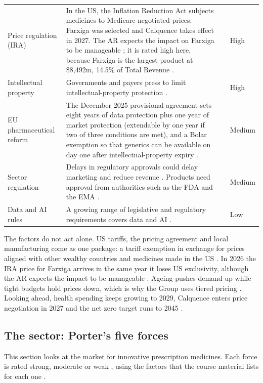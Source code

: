 \begin{xltabular}{\linewidth}{@{}N{2.6cm}Yp{2.1cm}p{1.5cm}@{}}
\midrule
Price regulation (IRA) & In the US, the Inflation Reduction Act subjects medicines to Medicare-negotiated prices. Farxiga was selected and Calquence takes effect in 2027. The AR expects the impact on Farxiga to be manageable \cite[p.~33]{AR}; it is rated high here, because Farxiga is the largest product at \$8,492m, 14.5\% of Total Revenue \cite[p.~56]{AR}. &  & High \\
Intellectual property & Governments and payers press to limit intellectual-property protection \cite[p.~49]{AR}. &  & High \\
EU pharmaceutical reform & The December 2025 provisional agreement sets eight years of data protection plus one year of market protection (extendable by one year if two of three conditions are met), and a Bolar exemption so that generics can be available on day one after intellectual-property expiry \cite{EU}. &  & Medium \\
Sector regulation & Delays in regulatory approvals could delay marketing and reduce revenue \cite[p.~48]{AR}. Products need approval from authorities such as the FDA and the EMA \cite[p.~20]{AR}. &  & Medium \\
Data and AI rules & A growing range of legislative and regulatory requirements covers data and AI \cite[p.~48]{AR}. &  & Low \\
\end{xltabular}

\begin{analysis}
The factors do not act alone. US tariffs, the pricing agreement and local manufacturing come as one package: a tariff exemption in exchange for prices aligned with other wealthy countries and medicines made in the US \cite[pp.~4, 32--33]{AR}. In 2026 the IRA price for Farxiga arrives in the same year it loses US exclusivity, although the AR expects the impact to be manageable \cite[p.~33]{AR}. Ageing pushes demand up while tight budgets hold prices down, which is why the Group uses tiered pricing \cite[pp.~6--7, 41]{AR}. Looking ahead, health spending keeps growing to 2029, Calquence enters price negotiation in 2027 and the net zero target runs to 2045 \cite[pp.~6, 33, 42]{AR}.
\end{analysis}

\subsection{The sector: Porter's five forces}
This section looks at the market for innovative prescription medicines. Each force is rated strong, moderate or weak \cite[p.~21]{PLAN}, using the factors that the course material lists for each one \cite[pp.~22--24]{PLAN}.


